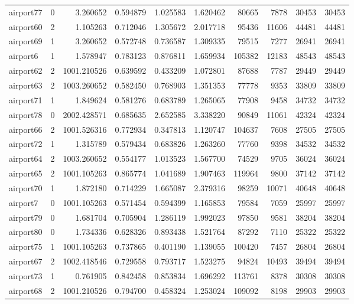 \begin{longtable}{|l|r|r|r|r|r|r|r|r|r|}
airport77 & 0 & 3.260652 & 0.594879 & 1.025583 & 1.620462 & 80665 & 7878 & 30453 & 30453 \\
airport60 & 2 & 1.105263 & 0.712046 & 1.305672 & 2.017718 & 95436 & 11606 & 44481 & 44481 \\
airport69 & 1 & 3.260652 & 0.572748 & 0.736587 & 1.309335 & 79515 & 7277 & 26941 & 26941 \\
airport6 & 1 & 1.578947 & 0.783123 & 0.876811 & 1.659934 & 105382 & 12183 & 48543 & 48543 \\
airport62 & 2 & 1001.210526 & 0.639592 & 0.433209 & 1.072801 & 87688 & 7787 & 29449 & 29449 \\
airport63 & 2 & 1003.260652 & 0.582450 & 0.768903 & 1.351353 & 77778 & 9353 & 33809 & 33809 \\
airport71 & 1 & 1.849624 & 0.581276 & 0.683789 & 1.265065 & 77908 & 9458 & 34732 & 34732 \\
airport78 & 0 & 2002.428571 & 0.685635 & 2.652585 & 3.338220 & 90849 & 11061 & 42324 & 42324 \\
airport66 & 2 & 1001.526316 & 0.772934 & 0.347813 & 1.120747 & 104637 & 7608 & 27505 & 27505 \\
airport72 & 1 & 1.315789 & 0.579434 & 0.683826 & 1.263260 & 77760 & 9398 & 34532 & 34532 \\
airport64 & 2 & 1003.260652 & 0.554177 & 1.013523 & 1.567700 & 74529 & 9705 & 36024 & 36024 \\
airport65 & 2 & 1001.105263 & 0.865774 & 1.041689 & 1.907463 & 119964 & 9800 & 37142 & 37142 \\
airport70 & 1 & 1.872180 & 0.714229 & 1.665087 & 2.379316 & 98259 & 10071 & 40648 & 40648 \\
airport7 & 0 & 1001.105263 & 0.571454 & 0.594399 & 1.165853 & 79584 & 7059 & 25997 & 25997 \\
airport79 & 0 & 1.681704 & 0.705904 & 1.286119 & 1.992023 & 97850 & 9581 & 38204 & 38204 \\
airport80 & 0 & 1.734336 & 0.628326 & 0.893438 & 1.521764 & 87292 & 7110 & 25322 & 25322 \\
airport75 & 1 & 1001.105263 & 0.737865 & 0.401190 & 1.139055 & 100420 & 7457 & 26804 & 26804 \\
airport67 & 2 & 1002.418546 & 0.729558 & 0.793717 & 1.523275 & 94824 & 10493 & 39494 & 39494 \\
airport73 & 1 & 0.761905 & 0.842458 & 0.853834 & 1.696292 & 113761 & 8378 & 30308 & 30308 \\
airport68 & 2 & 1001.210526 & 0.794700 & 0.458324 & 1.253024 & 109092 & 8198 & 29903 & 29903 \\

\end{longtable}
